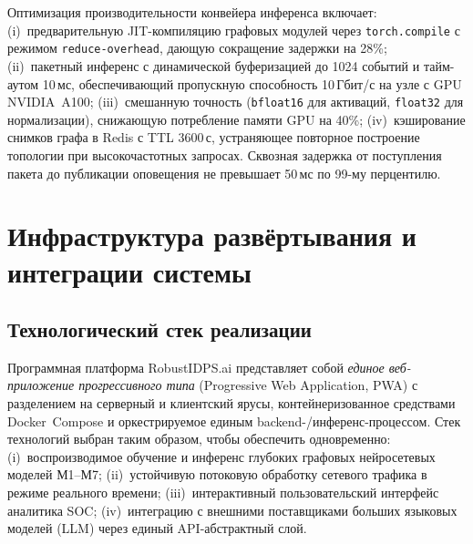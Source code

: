 Оптимизация производительности конвейера инференса включает: (i)~предварительную JIT-компиляцию графовых модулей через \texttt{torch.compile} с режимом \texttt{reduce-overhead}, дающую сокращение задержки на 28\%; (ii)~пакетный инференс с динамической буферизацией до 1024 событий и тайм-аутом 10\,мс, обеспечивающий пропускную способность 10\,Гбит/с на узле с GPU NVIDIA~A100; (iii)~смешанную точность (\texttt{bfloat16} для активаций, \texttt{float32} для нормализации), снижающую потребление памяти GPU на 40\%; (iv)~кэширование снимков графа в Redis с TTL 3600\,с, устраняющее повторное построение топологии при высокочастотных запросах. Сквозная задержка от поступления пакета до публикации оповещения не превышает 50\,мс по 99-му перцентилю.

\section{Инфраструктура развёртывания и интеграции системы}
\label{sec:tech_stack_ui}

\subsection{Технологический стек реализации}
\label{subsec:tech_stack}

Программная платформа RobustIDPS.ai представляет собой
\emph{единое веб-приложение прогрессивного типа}
(Progressive Web Application, PWA) с разделением на серверный и
клиентский ярусы, контейнеризованное средствами Docker~Compose и
оркестрируемое единым backend-/инференс-процессом. Стек технологий
выбран таким образом, чтобы обеспечить одновременно: (i)~воспроизводимое
обучение и инференс глубоких графовых нейросетевых моделей М1--М7;
(ii)~устойчивую потоковую обработку сетевого трафика в режиме
реального времени; (iii)~интерактивный пользовательский интерфейс
аналитика SOC; (iv)~интеграцию с внешними поставщиками больших
языковых моделей (LLM) через единый API-абстрактный слой.


